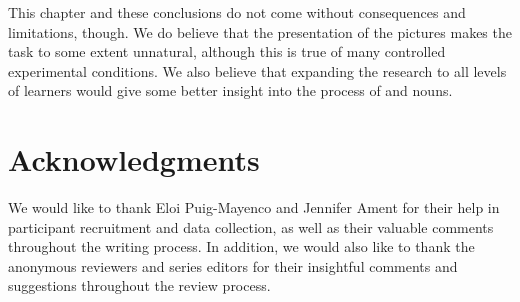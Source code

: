 \documentclass[output=paper]{langsci/langscibook}
\begin{document}
This chapter and these conclusions do not come without consequences and limitations, though. We do believe that the presentation of the pictures makes the task to some extent unnatural, although this is true of many controlled experimental conditions. We also believe that expanding the research to all levels of learners would give some better insight into the  process of  and  nouns. 

\section*{Acknowledgments}

We would like to thank Eloi Puig-Mayenco and Jennifer Ament for their help in participant recruitment and data collection, as well as their valuable comments throughout the writing process. In addition, we would also like to thank the anonymous reviewers and series editors for their insightful comments and suggestions throughout the review process. 


\sloppy
\printbibliography[heading=subbibliography,notkeyword=this] 
\end{document}
